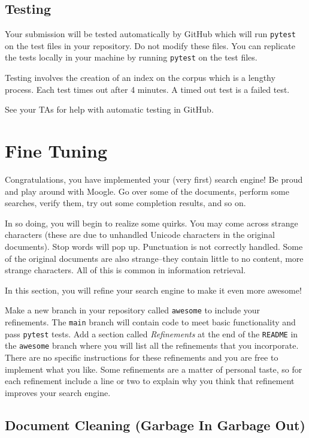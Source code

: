 \documentclass[addpoints]{exam}
\begin{document}
\subsection{Testing}

Your submission will be tested automatically by GitHub which will run \texttt{pytest} on the test files in your repository. Do not modify these files. You can replicate the tests locally in your machine by running \texttt{pytest} on the test files.

Testing involves the creation of an index on the corpus which is a lengthy process. Each test times out after 4 minutes. A timed out test is a failed test.

See your TAs for help with automatic testing in GitHub.
   
\section{Fine Tuning}
\label{sec:refine}

Congratulations, you have implemented your (very first) search engine! Be proud and play around with Moogle. Go over some of the documents, perform some searches, verify them, try out some completion results, and so on.

In so doing, you will begin to realize some quirks. You may come across strange characters (these are due to unhandled Unicode characters in the original documents). Stop words will pop up. Punctuation is not correctly handled. Some of the original documents are also strange--they contain little to no content, more strange characters. All of this is common in information retrieval.

In this section, you will refine your search engine to make it even more awesome!

Make a new branch in your repository called \texttt{awesome} to include your refinements. The \texttt{main} branch will contain code to meet basic functionality and pass \texttt{pytest} tests. Add a section called \textit{Refinements} at the end of the \texttt{README} in the \texttt{awesome} branch where you will list all the refinements that you incorporate. There are no specific instructions for these refinements and you are free to implement what you like. Some refinements are a matter of personal taste, so for each refinement include a line or two to explain why you think that refinement improves your search engine.

\subsection{Document Cleaning (Garbage In Garbage Out)}
\end{document}
